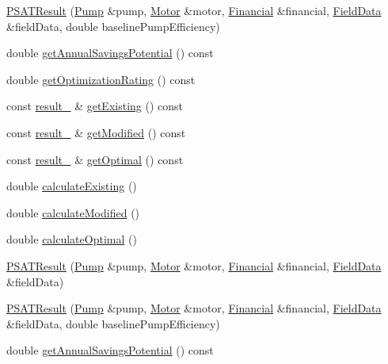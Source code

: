 \begin{DoxyCompactItemize}
\item 
\hyperlink{class_p_s_a_t_result_a89db10b4bcc52985fbb36e8c5afce2ab}{P\+S\+A\+T\+Result} (\hyperlink{class_pump}{Pump} \&pump, \hyperlink{class_motor}{Motor} \&motor, \hyperlink{class_financial}{Financial} \&financial, \hyperlink{class_field_data}{Field\+Data} \&field\+Data, double baseline\+Pump\+Efficiency)
\item 
double \hyperlink{class_p_s_a_t_result_a14fc75c2e0e92f74e3df1b97ed13b496}{get\+Annual\+Savings\+Potential} () const
\item 
double \hyperlink{class_p_s_a_t_result_aa0a7001461408fcb06a6c22ce2d064db}{get\+Optimization\+Rating} () const
\item 
const \hyperlink{struct_p_s_a_t_result_1_1result__}{result\+\_\+} \& \hyperlink{class_p_s_a_t_result_a4da660959f368bdf0951728c9c5f931b}{get\+Existing} () const
\item 
const \hyperlink{struct_p_s_a_t_result_1_1result__}{result\+\_\+} \& \hyperlink{class_p_s_a_t_result_ae43bb3b001e2746292d0dd0d6cebcfdd}{get\+Modified} () const
\item 
const \hyperlink{struct_p_s_a_t_result_1_1result__}{result\+\_\+} \& \hyperlink{class_p_s_a_t_result_af587235430371a05799c60e81aa8dfad}{get\+Optimal} () const
\item 
double \hyperlink{class_p_s_a_t_result_a594e019e535fb402d6d0441d50f8b697}{calculate\+Existing} ()
\item 
double \hyperlink{class_p_s_a_t_result_afbb68257a28c1b853d26faf3227461cc}{calculate\+Modified} ()
\item 
double \hyperlink{class_p_s_a_t_result_a25d50cd89b326f18449496a56d54f472}{calculate\+Optimal} ()
\item 
\hyperlink{class_p_s_a_t_result_af6f9d5dbd3a6aac3d7e5e212e3a40487}{P\+S\+A\+T\+Result} (\hyperlink{class_pump}{Pump} \&pump, \hyperlink{class_motor}{Motor} \&motor, \hyperlink{class_financial}{Financial} \&financial, \hyperlink{class_field_data}{Field\+Data} \&field\+Data)
\item 
\hyperlink{class_p_s_a_t_result_a89db10b4bcc52985fbb36e8c5afce2ab}{P\+S\+A\+T\+Result} (\hyperlink{class_pump}{Pump} \&pump, \hyperlink{class_motor}{Motor} \&motor, \hyperlink{class_financial}{Financial} \&financial, \hyperlink{class_field_data}{Field\+Data} \&field\+Data, double baseline\+Pump\+Efficiency)
\item 
double \hyperlink{class_p_s_a_t_result_a14fc75c2e0e92f74e3df1b97ed13b496}{get\+Annual\+Savings\+Potential} () const
\item 

\end{DoxyCompactItemize}
